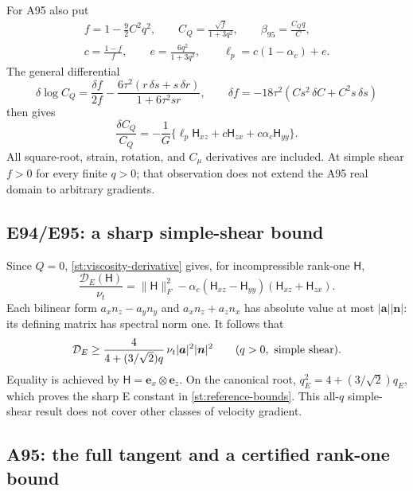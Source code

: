 \documentclass[11pt,a4paper]{article}
\numberwithin{equation}{section}
\newcommand{\nut}{\nu_t}
\begin{document}
For A95 also put
\begin{equation}
 \begin{gathered}
 f=1-\frac92C^2q^2,\qquad
 C_Q=\frac{\sqrt f}{1+3q^2},\qquad
 \beta_{95}=\frac{C_Qq}{C},\\
 c=\frac{1-f}{f},\qquad e=\frac{6q^2}{1+3q^2},\qquad
 \ell_p=c(1-\alpha_c)+e .
 \end{gathered}
 \label{st:a95-coefficients}
\end{equation}
The general differential
\[
 \delta\log C_Q
 =\frac{\delta f}{2f}
 -\frac{6\tau^2(r\,\delta s+s\,\delta r)}
             {1+6\tau^2sr},\qquad
 \delta f=-18\tau^2(Cs^2\,\delta C+C^2s\,\delta s)
\]
then gives
\begin{equation}
 \boxed{\frac{\delta C_Q}{C_Q}
 =-\frac1G\{\ell_p\mathsf H_{xz}
              +c\mathsf H_{zx}+c\alpha_c\mathsf H_{yy}\}.}
 \label{st:a95-cq-derivative}
\end{equation}
All square-root, strain, rotation, and $C_\mu$ derivatives are
included. At simple shear $f>0$ for every finite $q>0$; that
observation does not extend the A95 real domain to arbitrary
gradients.

\subsection{E94/E95: a sharp simple-shear bound}
\label{st:e-bound}

Since $Q=0$, \cref{st:viscosity-derivative} gives, for incompressible
rank-one $\mathsf H$,
\begin{equation}
 \boxed{\frac{\mathcal D_E(\mathsf H)}{\nut}
 =\|\mathsf H\|_F^2
 -\alpha_c(\mathsf H_{xz}-\mathsf H_{yy})
              (\mathsf H_{xz}+\mathsf H_{zx}).}
 \label{st:e-rank-one}
\end{equation}
Each bilinear form
$a_xn_z-a_yn_y$ and $a_xn_z+a_zn_x$ has absolute value at most
$|\boldsymbol a||\boldsymbol n|$: its defining matrix has spectral
norm one. It follows that
\begin{equation}
 \mathcal D_E\ge
 \frac{4}{4+(3/\sqrt2)q}\,
 \nut|\boldsymbol a|^2|\boldsymbol n|^2
 \qquad(q>0,\ \hbox{simple shear}).
 \label{st:e-q-bound}
\end{equation}
Equality is achieved by
$\mathsf H=\boldsymbol e_x\otimes\boldsymbol e_z$.
On the canonical root,
$q_E^2=4+(3/\sqrt2)q_E$, which proves the sharp E constant in
\cref{st:reference-bounds}. This all-$q$ simple-shear result does
not cover other classes of velocity gradient.

\subsection{A95: the full tangent and a certified rank-one bound}
\label{st:a95-bound}
\end{document}
